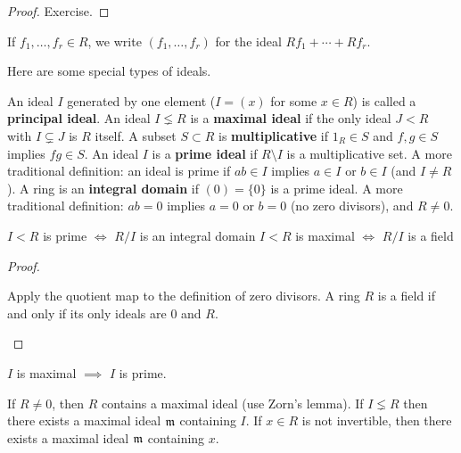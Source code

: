 \begin{proof}
	Exercise.
\end{proof}

\begin{note}
	If $f_1,\ldots,f_r \in R$, we write $(f_1,\ldots,f_r)$ for the ideal
	$Rf_1+\cdots+Rf_r$.
\end{note}

\begin{defn}
	Here are some special types of ideals.
	\begin{enum}
		\io An ideal $I$ generated by one element ($I=(x)$ for some $x \in R$) is called a \textbf{principal ideal}.
		\io An ideal $I \lneq R$ is a \textbf{maximal ideal} if the only ideal $J<R$ with $I \subsetneq J$ is $R$ itself.
		\io A subset $S \subset R$ is \textbf{multiplicative} if $1_R \in S$ and $f,g \in S$ implies $fg \in S$.
		\io An ideal $I$ is a \textbf{prime ideal} if $R \setminus I$ is a multiplicative set.
		A more traditional definition: an ideal is prime if $ab \in I$ implies $a \in I$ or $b \in I$ (and $I \neq R$).
		\io A ring is an \textbf{integral domain} if $(0)=\{0\}$ is a prime ideal.
		A more traditional definition: $ab=0$ implies $a=0$ or $b=0$ (no zero divisors), and $R \neq 0$.
	\end{enum}
\end{defn}

\begin{prop}
	\leavevmode
	\begin{enum}
		\io $I<R$ is prime $\iff$ $R/I$ is an integral domain
		\io $I<R$ is maximal $\iff$ $R/I$ is a field
	\end{enum}
\end{prop}

\begin{proof}
	\leavevmode
	\begin{enum}
		\io Apply the quotient map to the definition of zero divisors.
		\io A ring $R$ is a field if and only if its only ideals are $0$ and $R$. \qedhere
	\end{enum}
\end{proof}

\begin{cor}
	$I$ is maximal $\implies$ $I$ is prime.
\end{cor}

\begin{exer}
	\leavevmode
	\begin{enum}
		\io If $R \neq 0$, then $R$ contains a maximal ideal (use Zorn's lemma).
		\io If $I\lneq R$ then there exists a maximal ideal $\mathfrak{m}$ containing $I$.
		\io If $x \in R$ is not invertible, then there exists a maximal ideal $\mathfrak{m}$ containing $x$.
	\end{enum}
\end{exer}

